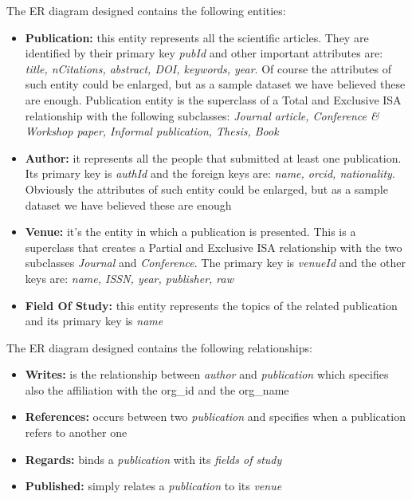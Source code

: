 \documentclass{Configuration_Files/PoliMi3i_thesis}
\begin{document}
\newpage
The ER diagram designed contains the following entities:
\begin{itemize}
    \item \textbf{Publication:} this entity represents all the scientific articles. They are identified by their primary key \emph{pubId}
            and other important attributes are: \emph{title, nCitations, abstract, DOI, keywords, year}.
            Of course the attributes of such entity could be enlarged, but as a sample dataset we have believed these are enough.
            Publication entity is the superclass of a Total and Exclusive ISA relationship with the following subclasses:
            \emph{Journal article, Conference \& Workshop paper, Informal publication, Thesis, Book}
    \item \textbf{Author:} it represents all the people that submitted at least one publication. Its primary key is \emph{authId} and the
            foreign keys are: \emph{name, orcid, nationality}.
            Obviously the attributes of such entity could be enlarged, but as a sample dataset we have believed these are enough
    \item \textbf{Venue:} it's the entity in which a publication is presented. This is a superclass that creates a Partial and Exclusive
            ISA relationship with the two subclasses \emph{Journal} and \emph{Conference}.
            The primary key is \emph{venueId} and the other keys are: \emph{name, ISSN, year, publisher, raw}
    \item \textbf{Field Of Study:} this entity represents the topics of the related publication and its primary key is \emph{name}
\end{itemize}
\bigskip

The ER diagram designed contains the following relationships:
\begin{itemize}
    \item \textbf{Writes:} is the relationship between \emph{author} and \emph{publication} which specifies also the affiliation
            with the org\_id and the org\_name
    \item \textbf{References:} occurs between two \emph{publication} and specifies when a publication refers to another one
    \item \textbf{Regards:} binds a \emph{publication} with its \emph{fields of study}
    \item \textbf{Published:} simply relates a \emph{publication} to its \emph{venue}
\end{itemize}
\end{document}
